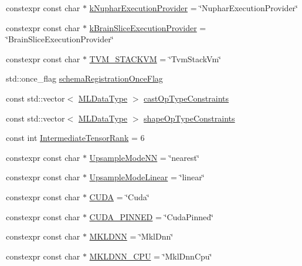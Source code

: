 \begin{DoxyCompactItemize}
\item 
constexpr const char $\ast$ \mbox{\hyperlink{namespaceonnxruntime_a1d1ae47414d655ea396acf0c7c28ba4f}{k\+Nuphar\+Execution\+Provider}} = \char`\"{}Nuphar\+Execution\+Provider\char`\"{}
\item 
constexpr const char $\ast$ \mbox{\hyperlink{namespaceonnxruntime_a9ece12f53da048b414061bbdadd3b49a}{k\+Brain\+Slice\+Execution\+Provider}} = \char`\"{}Brain\+Slice\+Execution\+Provider\char`\"{}
\item 
constexpr const char $\ast$ \mbox{\hyperlink{namespaceonnxruntime_a33c9de98d6481d456b397e3f20d2ff46}{T\+V\+M\+\_\+\+S\+T\+A\+C\+K\+VM}} = \char`\"{}Tvm\+Stack\+Vm\char`\"{}
\item 
std\+::once\+\_\+flag \mbox{\hyperlink{namespaceonnxruntime_a94e66331bfcd428a630476bbf0e2733f}{schema\+Registration\+Once\+Flag}}
\item 
const std\+::vector$<$ \mbox{\hyperlink{namespaceonnxruntime_ad77d0a6e838ec7da5dc35fed5ee66b49}{M\+L\+Data\+Type}} $>$ \mbox{\hyperlink{namespaceonnxruntime_a2dba74e72194e59c7cb75bd0c838fb0b}{cast\+Op\+Type\+Constraints}}
\item 
const std\+::vector$<$ \mbox{\hyperlink{namespaceonnxruntime_ad77d0a6e838ec7da5dc35fed5ee66b49}{M\+L\+Data\+Type}} $>$ \mbox{\hyperlink{namespaceonnxruntime_a20b1177be7f6d1d313e81b0441fa7664}{shape\+Op\+Type\+Constraints}}
\item 
const int \mbox{\hyperlink{namespaceonnxruntime_a4d3d095c777de3e01ad735f72a5072d5}{Intermediate\+Tensor\+Rank}} = 6
\item 
constexpr const char $\ast$ \mbox{\hyperlink{namespaceonnxruntime_a3344ca5e754b9d37adc26849338b39e6}{Upsample\+Mode\+NN}} = \char`\"{}nearest\char`\"{}
\item 
constexpr const char $\ast$ \mbox{\hyperlink{namespaceonnxruntime_a4e73116d10c0f961566ca6634dbd771d}{Upsample\+Mode\+Linear}} = \char`\"{}linear\char`\"{}
\item 
constexpr const char $\ast$ \mbox{\hyperlink{namespaceonnxruntime_ae3f1c8a44631eb0dd833092f8ec6c750}{C\+U\+DA}} = \char`\"{}Cuda\char`\"{}
\item 
constexpr const char $\ast$ \mbox{\hyperlink{namespaceonnxruntime_a50613d3dd1ffbf9871c50182a768aad1}{C\+U\+D\+A\+\_\+\+P\+I\+N\+N\+ED}} = \char`\"{}Cuda\+Pinned\char`\"{}
\item 
constexpr const char $\ast$ \mbox{\hyperlink{namespaceonnxruntime_a825d8d03ac7e32f7646ad9ea09bba5f9}{M\+K\+L\+D\+NN}} = \char`\"{}Mkl\+Dnn\char`\"{}
\item 
constexpr const char $\ast$ \mbox{\hyperlink{namespaceonnxruntime_ac8a460be2f9fe7ac78bfb3534cd5dd4c}{M\+K\+L\+D\+N\+N\+\_\+\+C\+PU}} = \char`\"{}Mkl\+Dnn\+Cpu\char`\"{}
\end{DoxyCompactItemize}


